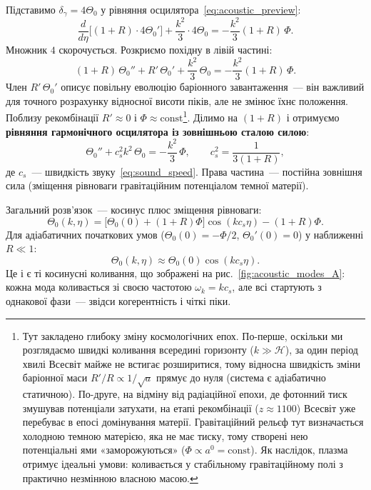 Підставимо $\delta_\gamma = 4\Theta_0$ у рівняння
осцилятора~\eqref{eq:acoustic_preview}:
\begin{equation*}
  \frac{d}{d\eta}\bigl[(1+R)\cdot 4\Theta_0'\bigr]
  + \frac{k^2}{3}\cdot 4\Theta_0
  = -\frac{k^2}{3}(1+R)\,\Phi.
\end{equation*}
Множник $4$ скорочується. Розкриємо похідну в лівій частині:
\begin{equation*}
  (1+R)\,\Theta_0'' + R'\,\Theta_0'
  + \frac{k^2}{3}\,\Theta_0
  = -\frac{k^2}{3}(1+R)\,\Phi.
\end{equation*}
Член $R'\,\Theta_0'$ описує повільну еволюцію баріонного
завантаження~--- він важливий для точного розрахунку
відносної висоти піків, але не змінює їхнє положення.
Поблизу рекомбінації $R' \approx 0$ і $\Phi \approx \mathrm{const}$\footnote{%
Тут закладено глибоку зміну космологічних епох.
По-перше, оскільки ми розглядаємо швидкі коливання всередині горизонту ($k \gg \mathcal{H}$),
за один період хвилі Всесвіт майже не встигає розширитися, тому відносна швидкість зміни
баріонної маси $R'/R \propto 1/\sqrt{a}$ прямує до нуля (система є адіабатично статичною).
По-друге, на відміну від радіаційної епохи, де фотонний тиск змушував потенціали затухати,
на етапі рекомбінації ($z \approx 1100$) Всесвіт уже перебуває в епосі домінування матерії.
Гравітаційний рельєф тут визначається холодною темною матерією, яка не має тиску,
тому створені нею потенціальні ями «заморожуються» ($\Phi \propto a^0 = \mathrm{const}$).
Як наслідок, плазма отримує ідеальні умови: коливається у стабільному гравітаційному
полі з практично незмінною власною масою.}. Ділимо на $(1+R)$ і отримуємо \textbf{рівняння
гармонічного осцилятора із зовнішньою сталою силою}:
\begin{equation}\label{eq:Theta0_osc}
  \Theta_0'' + c_s^2 k^2\,\Theta_0 = -\frac{k^2}{3}\,\Phi,
  \qquad c_s^2 = \frac{1}{3(1+R)},
\end{equation}
де $c_s$~--- швидкість звуку~\eqref{eq:sound_speed}.
Права частина~--- постійна зовнішня сила (зміщення рівноваги
гравітаційним потенціалом темної матерії).

Загальний розв'язок~--- косинус плюс зміщення рівноваги:
\[
  \Theta_0(k,\eta)
  = \bigl[\Theta_0(0) + (1+R)\Phi\bigr]\cos(k c_s \eta)
    - (1+R)\Phi.
\]
Для адіабатичних початкових умов ($\Theta_0(0) = -\Phi/2$,
$\Theta_0'(0) = 0$) у наближенні $R \ll 1$:
\begin{equation}\label{eq:Theta0_solution}
  \Theta_0(k,\eta) \approx \Theta_0(0)\cos(k c_s \eta).
\end{equation}
Це і є ті косинусні коливання, що зображені на
рис.~\ref{fig:acoustic_modes_A}: кожна мода коливається
зі своєю частотою $\omega_k = k c_s$, але всі стартують
з однакової фази~--- звідси когерентність і чіткі піки.

